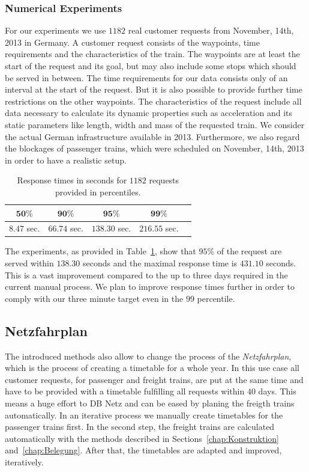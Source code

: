 \subsubsection{Numerical Experiments}
For our experiments we use $1182$ real customer requests from November, 14th, 2013 in Germany. A customer request consists of the waypoints, time requirements and the characteristics of the train. The waypoints are at least the start of the request and its goal, but may also include some stops which should be served in between. The time requirements for our data consists only of an interval at the start of the request. But it is also possible to provide further time restrictions on the other waypoints. The characteristics of the request include all data necessary to calculate its dynamic properties such as acceleration and its static parameters like length, width and mass of the requested train. We consider the actual German infrastructure available in 2013. Furthermore, we also regard the blockages of passenger trains, which were scheduled on November, 14th, 2013 in order to have a realistic setup.
%
\begin{table}[h]
	\centering
	\caption{Response times in seconds for $1182$ requests provided in percentiles.}
	\label{tab:result_CnR}
	\begin{tabular}{ccccc} \hline
		$\textbf{50\%}$ & $\textbf{90\%}$ & $\textbf{95\%}$ & $\textbf{99\%}$ \\ \hline
		$8.47$ sec.     & $66.74$ sec.    & $138.30$ sec.   & $216.55$ sec.   \\
	\end{tabular}
\end{table}
\par

The experiments, as provided in Table~\ref{tab:result_CnR}, show that $95\%$ of the request are served within $138.30$ seconds and the maximal response time is $431.10$ seconds. This is a vast improvement compared to the up to three days required in the current manual process. We plan to improve response times further in order to comply with our three minute target even in the $99$ percentile.

\subsection{Netzfahrplan}
\label{chap:Netzfahrplan}

The introduced methods also allow to change the process of the \emph{Netzfahrplan}, which is the process of creating a timetable for a whole year. In this use case all customer requests, for passenger and freight trains, are put at the same time and have to be provided with a timetable fulfilling all requests within $40$ days. This means a huge effort to DB Netz and can be eased by planing the freigth trains automatically. In an iterative process we manually create timetables for the passenger trains first. In the second step, the freight trains are calculated automatically with the methods described in Sections~\ref{chap:Konstruktion} and~\ref{chap:Belegung}. After that, the timetables are adapted and improved, iteratively.

